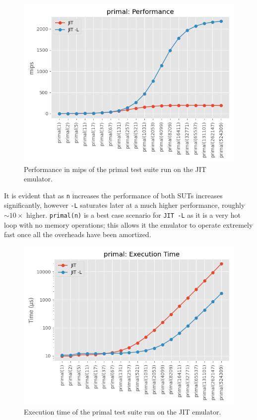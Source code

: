 \begin{figure}[H]
    \centering
    \includegraphics[scale=0.75]{output/graphs/tests/jit/primal/mips.png}
    \caption{Performance in mips of the primal test suite run on the JIT emulator.}
    \label{figure:jit-primal-mips}
\end{figure}

It is evident that as \texttt{n} increases the performance of both SUTs increases significantly, however \texttt{-L} saturates later at a much higher performance, roughly $\sim 10\times$ higher. \texttt{primal(n)} is a best case scenario for \texttt{JIT -L} as it is a very hot loop with no memory operations; this allows it the emulator to operate extremely fast once all the overheads have been amortized.

\begin{figure}[H]
    \centering
    \includegraphics[scale=0.75]{output/graphs/tests/jit/primal/time.png}
    \caption{Execution time of the primal test suite run on the JIT emulator.}
    \label{figure:jit-primal-time}
\end{figure}

